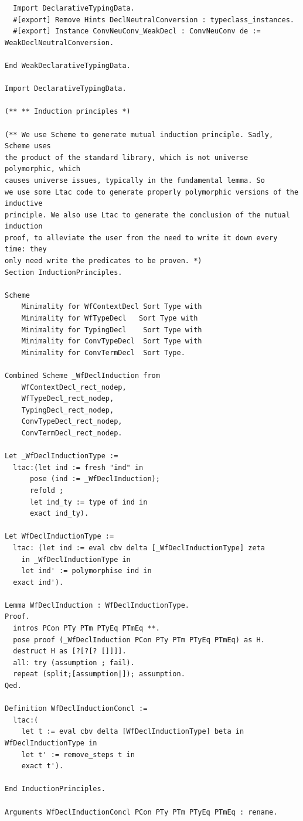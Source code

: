 \begin{lstlisting}
  Import DeclarativeTypingData.
  #[export] Remove Hints DeclNeutralConversion : typeclass_instances.
  #[export] Instance ConvNeuConv_WeakDecl : ConvNeuConv de := WeakDeclNeutralConversion.

End WeakDeclarativeTypingData.

Import DeclarativeTypingData.

(** ** Induction principles *)

(** We use Scheme to generate mutual induction principle. Sadly, Scheme uses
the product of the standard library, which is not universe polymorphic, which
causes universe issues, typically in the fundamental lemma. So
we use some Ltac code to generate properly polymorphic versions of the inductive
principle. We also use Ltac to generate the conclusion of the mutual induction
proof, to alleviate the user from the need to write it down every time: they
only need write the predicates to be proven. *)
Section InductionPrinciples.

Scheme 
    Minimality for WfContextDecl Sort Type with
    Minimality for WfTypeDecl   Sort Type with
    Minimality for TypingDecl    Sort Type with
    Minimality for ConvTypeDecl  Sort Type with
    Minimality for ConvTermDecl  Sort Type.

Combined Scheme _WfDeclInduction from
    WfContextDecl_rect_nodep,
    WfTypeDecl_rect_nodep,
    TypingDecl_rect_nodep,
    ConvTypeDecl_rect_nodep,
    ConvTermDecl_rect_nodep.

Let _WfDeclInductionType :=
  ltac:(let ind := fresh "ind" in
      pose (ind := _WfDeclInduction);
      refold ;
      let ind_ty := type of ind in
      exact ind_ty).

Let WfDeclInductionType :=
  ltac: (let ind := eval cbv delta [_WfDeclInductionType] zeta
    in _WfDeclInductionType in
    let ind' := polymorphise ind in
  exact ind').

Lemma WfDeclInduction : WfDeclInductionType.
Proof.
  intros PCon PTy PTm PTyEq PTmEq **.
  pose proof (_WfDeclInduction PCon PTy PTm PTyEq PTmEq) as H.
  destruct H as [?[?[? []]]].
  all: try (assumption ; fail).
  repeat (split;[assumption|]); assumption.
Qed.

Definition WfDeclInductionConcl :=
  ltac:(
    let t := eval cbv delta [WfDeclInductionType] beta in WfDeclInductionType in
    let t' := remove_steps t in
    exact t').

End InductionPrinciples.

Arguments WfDeclInductionConcl PCon PTy PTm PTyEq PTmEq : rename.


\end{lstlisting}
